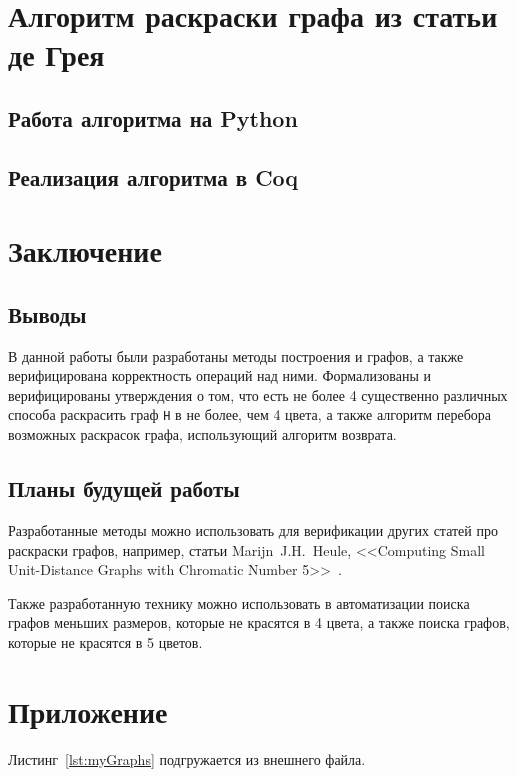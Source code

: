 \chapter{Алгоритм раскраски графа из статьи де Грея}

\section{Работа алгоритма на Python}
\section{Реализация алгоритма в Coq}
\label{chapt1}





\chapter{Заключение}

\section{Выводы}
В данной работы были разработаны методы построения и графов, а также верифицирована корректность операций над ними. Формализованы и верифицированы утверждения о том, что есть не более 4 существенно различных способа раскрасить граф {\tt H} в не более, чем 4 цвета, а также алгоритм перебора возможных раскрасок графа, использующий алгоритм возврата.

\section{Планы будущей работы}
Разработанные методы можно использовать для верификации других статей про раскраски графов, например, статьи Marijn~J.H.~Heule, <<Computing Small Unit-Distance Graphs with Chromatic Number 5>>~\cite{Huele}.

Также разработанную технику можно использовать в автоматизации поиска графов меньших размеров, которые не красятся в 4 цвета, а также поиска графов, которые не красятся в 5 цветов.

\chapter{Приложение}

Листинг~\ref{lst:myGraphs} подгружается из внешнего файла. 

\begingroup
    
\endgroup
 
